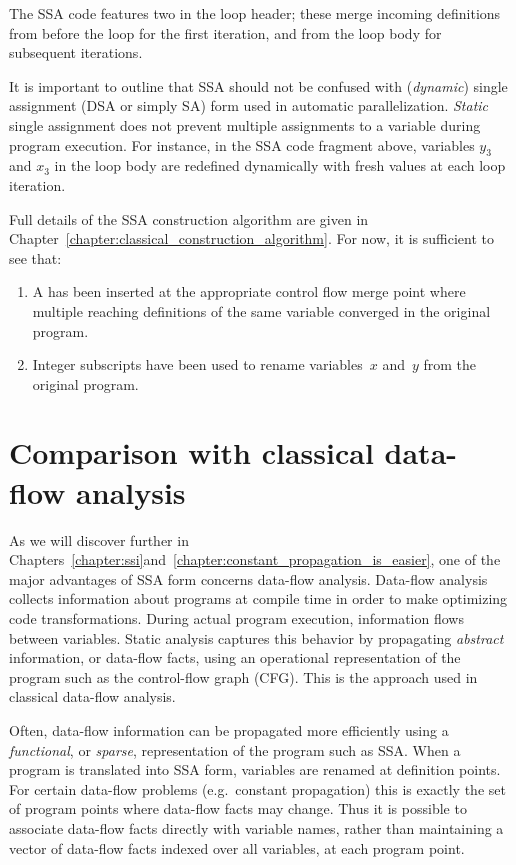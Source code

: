 The SSA code features two \phifuns in the loop header; these merge incoming definitions from before the loop for the first iteration, and from the loop body for subsequent iterations.

It is important to outline that SSA should not be confused with (\emph{dynamic}) single assignment (DSA or simply SA) form used in automatic parallelization. 
\emph{Static} single assignment does not prevent multiple assignments to a variable during program execution. 
For instance, in the SSA code fragment above, variables $y_3$ and $x_3$ in the loop body are redefined dynamically with fresh values at each loop iteration.

Full details of the SSA construction algorithm are given in Chapter~\ref{chapter:classical_construction_algorithm}. 
For now, it is sufficient to see that: \begin{enumerate} \item A \phifun has been inserted at the appropriate control flow merge point where multiple reaching definitions of the same variable converged in the original program.
\item Integer subscripts have been used to rename variables~$x$ and~$y$ from the original program.
\end{enumerate}

\section{Comparison with classical data-flow analysis} \label{sec:vanilla:dfa}
As we will discover further in Chapters~\ref{chapter:ssi}\ifconstantprop and~\ref{chapter:constant_propagation_is_easier}\fi, one of the major advantages of SSA form concerns data-flow analysis. Data-flow analysis collects information about programs at compile time in order to make optimizing code transformations. 
During actual program execution, information flows between variables. 
Static analysis captures this behavior by propagating \textit{abstract} information, or data-flow facts, using an operational representation of the program such as the control-flow graph (CFG). 
This is the approach used in classical data-flow analysis.

Often, data-flow information can be propagated more efficiently using a \textit{functional}, or \textit{sparse}, representation of the program such as SSA. 
When a program is translated into SSA form, variables are renamed at definition points. 
For certain data-flow problems (e.g.~constant propagation) this is exactly the set of program points where data-flow facts may change. 
Thus it is possible to associate data-flow facts directly with variable names, rather than maintaining a vector of data-flow facts indexed over all variables, at each program point.

